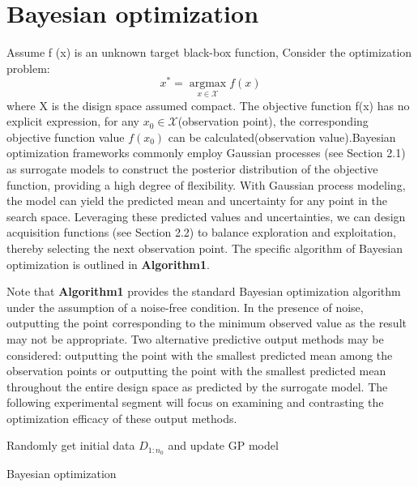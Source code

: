 \documentclass{article}
\begin{document}
\section{Bayesian optimization}
\hspace{2em}Assume f (x) is an unknown target black-box function, Consider the optimization problem:
\begin{equation}\label{eq1}
	x^* = \mathop{\arg\max}\limits_{x \in \mathcal{X}} f(x)
\end{equation}
where X is the disign space assumed compact. The objective function f(x) has no explicit expression, for any $x_0 \in \mathcal{X}$(observation point), the corresponding objective function value $f(x_0)$ can be calculated(observation value).Bayesian optimization frameworks commonly employ Gaussian processes (see Section 2.1) as surrogate models to construct the posterior distribution of the objective function, providing a high degree of flexibility. With Gaussian process modeling, the model can yield the predicted mean and uncertainty for any point in the search space. Leveraging these predicted values and uncertainties, we can design acquisition functions (see Section 2.2) to balance exploration and exploitation, thereby selecting the next observation point. The specific algorithm of Bayesian optimization is outlined in \textbf{Algorithm1}.

\hspace{2em}
Note that \textbf{Algorithm1} provides the standard Bayesian optimization algorithm under the assumption of a noise-free condition. In the presence of noise, outputting the point corresponding to the minimum observed value as the result may not be appropriate. Two alternative predictive output methods may be considered: outputting the point with the smallest predicted mean among the observation points or outputting the point with the smallest predicted mean throughout the entire design space as predicted by the surrogate model. The following experimental segment will focus on examining and contrasting the optimization efficacy of these output methods.
\begin{algorithm}[htb]
    \SetAlgoLined
  
    Randomly get initial data $D_{1:n_0}$ and update GP model\;
    \caption{Bayesian optimization}
\end{algorithm}
\end{document}
